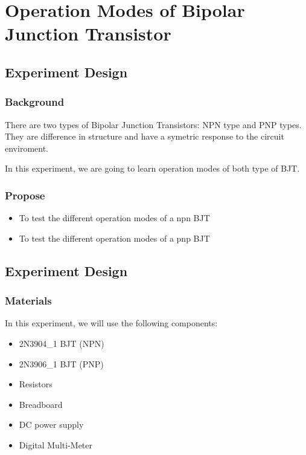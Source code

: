 \section{Operation Modes of Bipolar Junction Transistor}

\subsection{Experiment Design}
    \subsubsection{Background}
    There are two types of Bipolar Junction Transistors: NPN type and PNP types. They are difference in structure and have a symetric response to the circuit enviroment.\par

    In this experiment, we are going to learn operation modes of both type of BJT.\par

    \subsubsection{Propose}
    \begin{itemize}
        \item To test the different operation modes of a npn BJT
        \item To test the different operation modes of a pnp BJT
    \end{itemize}

\subsection{Experiment Design}
    \subsubsection{Materials}
        In this experiment, we will use the following components:
        \begin{itemize}
            \item 2N3904\_1 BJT (NPN)
            \item 2N3906\_1 BJT (PNP)
            \item Resistors
            \item Breadboard
            \item DC power supply
            \item Digital Multi-Meter
        \end{itemize}

